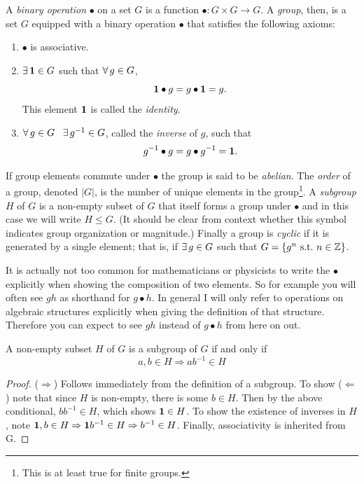 A {\it binary operation} $\bullet$ on a set 
$G$ is a function $\bullet : G\times G\to G$. A {\it group}, 
then, is a set $G$ equipped with a binary operation $\bullet$ that satisfies 
the following axioms:
  \begin{enumerate}
    \item $\bullet$ is associative.
    \item $\operatorname{\exists} {\mathbf 1} \in G$ such that $\operatorname{\forall} g \in G$, 
          \begin{equation}
            {\mathbf 1}\bullet g=g\bullet {\mathbf 1}=g. 
          \end{equation} This element ${\mathbf 1}$ is called the {\it identity}.
    \item $\operatorname{\forall} g \in G\ \ \operatorname{\exists} g^{-1} \in G$, called the 
          {\it inverse} of $g$, such that
          \begin{equation}
            g^{-1}\bullet g=g\bullet g^{-1}={\mathbf 1}.
          \end{equation}
  \end{enumerate}
If group elements commute under $\bullet$ the group is said to be 
{\it abelian}. The {\it order} of a group, 
denoted $|G|$, is the number of unique elements in the group\footnote{This
is at least true for finite groups.}. A {\it subgroup}
$H$ of $G$ is a non-empty subset of $G$ that itself forms a group under 
$\bullet$ and in this case we will write $H\leq G$. 
(It should be clear from context whether this symbol indicates group 
organization or magnitude.) Finally a group is {\it cyclic}
if it is generated by a single element; that is, if $\operatorname{\exists} g\in G$ such that 
$G=\left\{g^{n}~\text{s.t.}~ n\in\mathbb{Z}\right\}$.

It is actually not too common for mathematicians or physicists to write the
$\bullet$ explicitly when showing the composition of two elements. So for
example you will often see $gh$ as shorthand for $g\bullet h$. In general I will
only refer to operations on algebraic structures explicitly when giving the
definition of that structure. Therefore you can expect to see $gh$ instead of
$g\bullet h$ from here on out.

\begin{proposition}{}{}
  A non-empty subset $H$ of $G$ is a subgroup of $G$ if and only if
  $$a,b\in H\Rightarrow ab^{-1}\in H$$
  \begin{proof}
    ($\Rightarrow$) Follows immediately from the definition of a subgroup. To
    show ($\Leftarrow$) note that since $H$ is non-empty, there is some
    $b\in H$. Then by the above conditional, $bb^{-1}
    \in H$, which shows ${\mathbf 1}\in H$. To show the existence of inverses in $H$, 
    note ${\mathbf 1},b\in H\Rightarrow {\mathbf 1} b^{-1}\in H\Rightarrow b^{-1}\in H$. 
    Finally, associativity is inherited from G.
  \end{proof}
\end{proposition}

